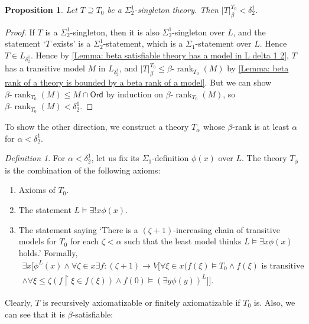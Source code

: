 \documentclass{amsart}
\newtheorem{proposition}[proposition]{Proposition}
\theoremstyle{remark}
\newtheorem{definition}[definition]{Definition}
\newcommand{\restricts}{\mathop{\upharpoonright}}
\newcommand{\betarank}{\beta\text{-}\operatorname{rank}}
\begin{document}
\begin{proposition}
    Let $T\supseteq T_0$ be a $\Sigma^1_2$-singleton theory. Then $|T|_{\beta}^{T_0}<\delta^1_2$.
\end{proposition}
\begin{proof}
    If $T$ is a $\Sigma^1_2$-singleton, then it is also $\Sigma^1_2$-singleton over $L$, and the statement `$T$ exists' is a $\Sigma^1_2$-statement, which is a $\Sigma_1$-statement over $L$. Hence $T\in L_{\delta^1_2}$.
    Hence by \autoref{Lemma: beta satisfiable theory has a model in L delta 1 2}, $T$ has a transitive model $M$ in $L_{\delta^1_2}$, and $|T|_{\beta}^{T_0}\le \betarank_{T_0}(M)$ by \autoref{Lemma: beta rank of a theory is bounded by a beta rank of a model}.
    But we can show $\betarank_{T_0}(M)\le M\cap \mathsf{Ord}$ by induction on $\betarank_{T_0}(M)$, so $\betarank_{T_0}(M)<\delta^1_2$.
\end{proof}

To show the other direction, we construct a theory $T_\alpha$ whose $\beta$-rank is at least $\alpha$ for $\alpha<\delta^1_2$.
\begin{definition}
    For $\alpha<\delta^1_2$, let us fix its $\Sigma_1$-definition $\phi(x)$ over $L$. The theory $T_\phi$ is the combination of the following axioms:
    \begin{enumerate}
        \item Axioms of $T_0$.
        \item The statement $L\vDash \exists! x \phi(x)$.
        \item The statement saying `There is a $(\zeta+1)$-increasing chain of transitive models for $T_0$ for each $\zeta<\alpha$ such that the least model thinks $L\vDash \exists x \phi(x)$ holds.' 
        Formally,
        \begin{multline*}
            \exists x \Big[\phi^L(x) \land \forall \zeta\in x \exists f\colon (\zeta+1)\to V\big[\forall \xi\in x  (f(\xi)\vDash T_0 \land \text{$f(\xi)$ is transitive } \\ \land \forall \xi\le \zeta (f\restricts \xi\in f(\xi)) \land f(0) \vDash (\exists y\phi(y))^L\big]\Big].
        \end{multline*}
    \end{enumerate}
\end{definition}
Clearly, $T$ is recursively axiomatizable or finitely axiomatizable if $T_0$ is. Also, we can see that it is $\beta$-satisfiable:
\end{document}
